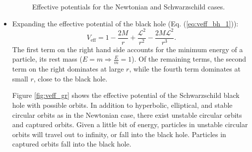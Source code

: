\documentclass[10pt]{article}
\begin{document}
\begin{itemize}
\begin{figure}[h]
\begin{subfigure}{0.5\textwidth}
\end{subfigure}
\caption{Effective potentials for the Newtonian and Schwarzschild cases.}
\end{figure}

\item
Expanding the effective potential of the black hole (Eq. (\ref{eq:veff_bh_1})):
\begin{equation}
V_{\text{eff}}= 1 - \dfrac{2M}{r} + \dfrac{\mathcal{L}^2}{r^2} - \dfrac{2M\mathcal{L}^2}{r^3}.
\end{equation}
The first term on the right hand side accounts for the minimum energy of a particle, its rest mass ($E=m \Rightarrow \frac{E}{m}=1$).
Of the remaining terms, the second term on the right dominates at large $r$, while the fourth term dominates at small $r$, close to the black hole.

Figure \ref{fig:veff_gr} shows the effective potential of the Schwarzschild black hole with possible orbits. In addition to hyperbolic, elliptical, and stable circular orbits as in the Newtonian case, there exist unstable circular orbits and captured orbits. Given a little bit of energy, particles in unstable circular orbits will travel out to infinity, or fall into the black hole. Particles in captured orbits fall into the black hole.

\end{itemize}
    	
    		
\end{document}
